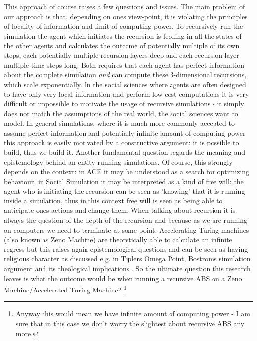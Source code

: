 This approach of course raises a few questions and issues. The main problem of our approach is that, depending on ones view-point, it is violating the principles of locality of information and limit of computing power. To recursively run the simulation the agent which initiates the recursion is feeding in all the states of the other agents and calculates the outcome of potentially multiple of its own steps, each potentially multiple recursion-layers deep and each recursion-layer multiple time-steps long. Both requires that each agent has perfect information about the complete simulation \textit{and} can compute these 3-dimensional recursions, which scale exponentially. In the social sciences where agents are often designed to have only very local information and perform low-cost computations it is very difficult or impossible to motivate the usage of recursive simulations - it simply does not match the assumptions of the real world, the social sciences want to model. In general simulations, where it is much more commonly accepted to assume perfect information and potentially infinite amount of computing power this approach is easily motivated by a constructive argument: it is possible to build, thus we build it.
Another fundamental question regards the meaning and epistemology behind an entity running simulations. Of course, this strongly depends on the context: in ACE it may be understood as a search for optimizing behaviour, in Social Simulation it may be interpreted as a kind of free will: the agent who is initiating the recursion can be seen as 'knowing' that it is running inside a simulation, thus in this context free will is seen as being able to anticipate ones actions and change them.
When talking about recursion it is always the question of the depth of the recursion and because as we are running on computers we need to terminate at some point. Accelerating Turing machines (also known as Zeno Machine) are theoretically able to calculate an infinite regress but this raises again epistemological questions and can be seen as having religious character as discussed e.g. in Tiplers Omega Point, Bostroms simulation argument \cite{bostrom_are_2003} and its theological implications \cite{steinhart_theological_2010}. So the ultimate question this research leaves is what the outcome would be when running a recursive ABS on a Zeno Machine/Accelerated Turing Machine? \footnote{Anyway this would mean we have infinite amount of computing power - I am sure that in this case we don't worry the slightest about recursive ABS any more.}


